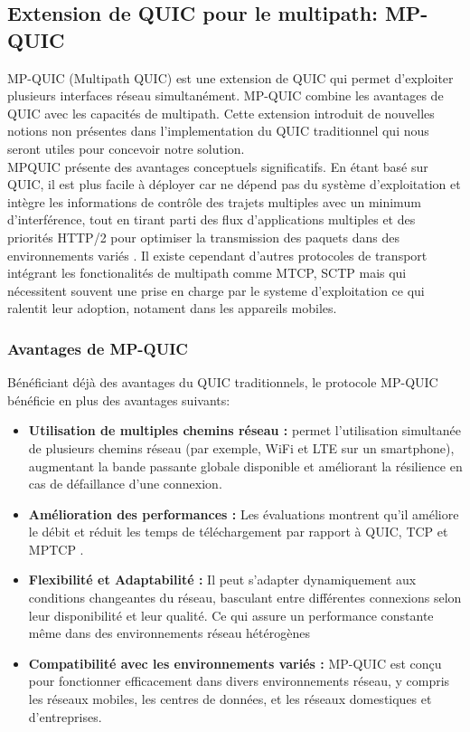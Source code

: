 \subsection{Extension de QUIC pour le multipath: MP-QUIC}
MP-QUIC (Multipath QUIC) est une extension de QUIC qui permet d'exploiter plusieurs interfaces réseau simultanément. MP-QUIC combine les avantages de QUIC avec les capacités de multipath. Cette extension introduit de nouvelles notions non présentes dans l'implementation du QUIC traditionnel qui nous seront utiles pour concevoir notre solution.\\

MPQUIC présente des avantages conceptuels significatifs. En étant basé sur QUIC, il est plus facile à déployer car ne dépend pas du système d'exploitation et intègre les informations de contrôle des trajets multiples avec un minimum d'interférence, tout en tirant parti des flux d'applications multiples et des priorités HTTP/2 pour optimiser la transmission des paquets dans des environnements variés \cite{8422951}. Il existe cependant d'autres protocoles de transport intégrant les fonctionalités de multipath comme MTCP, SCTP mais qui nécessitent souvent une prise en charge par le systeme d'exploitation ce qui ralentit leur adoption, notament dans les appareils mobiles. 


\subsubsection{Avantages de MP-QUIC}
Bénéficiant déjà des avantages du QUIC traditionnels, le protocole MP-QUIC bénéficie en plus des avantages suivants:
\begin{itemize}
    \item \textbf{Utilisation de multiples chemins réseau :} permet l'utilisation simultanée de plusieurs chemins réseau (par exemple, WiFi et LTE sur un smartphone), augmentant la bande passante globale disponible et améliorant la résilience en cas de défaillance d'une connexion.
    \item \textbf{Amélioration des performances :} Les évaluations montrent qu'il améliore le débit et réduit les temps de téléchargement par rapport à QUIC, TCP et MPTCP \cite{8422951}. 
    \item  \textbf{Flexibilité et Adaptabilité :} Il peut s'adapter dynamiquement aux conditions changeantes du réseau, basculant entre différentes connexions selon leur disponibilité et leur qualité. Ce qui assure un performance constante même dans des environnements réseau hétérogènes
    \item \textbf{Compatibilité avec les environnements variés :} MP-QUIC est conçu pour fonctionner efficacement dans divers environnements réseau, y compris les réseaux mobiles, les centres de données, et les réseaux domestiques et d'entreprises.
\end{itemize}


